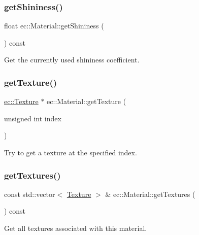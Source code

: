 \subsubsection{\texorpdfstring{get\+Shininess()}{getShininess()}}
{\footnotesize\ttfamily float ec\+::\+Material\+::get\+Shininess (\begin{DoxyParamCaption}{ }\end{DoxyParamCaption}) const}



Get the currently used shininess coefficient. 

\mbox{\label{classec_1_1_material_a8679615f24284e809f213b882bec81bf}} 
\subsubsection{\texorpdfstring{get\+Texture()}{getTexture()}}
{\footnotesize\ttfamily \mbox{\hyperlink{classec_1_1_texture}{ec\+::\+Texture}} $\ast$ ec\+::\+Material\+::get\+Texture (\begin{DoxyParamCaption}\item[{unsigned int}]{index }\end{DoxyParamCaption})}



Try to get a texture at the specified index. 

\mbox{\label{classec_1_1_material_a95d74f12ec9d69a764a249e36b6b857c}} 
\subsubsection{\texorpdfstring{get\+Textures()}{getTextures()}}
{\footnotesize\ttfamily const std\+::vector$<$ \mbox{\hyperlink{classec_1_1_texture}{Texture}} $>$ \& ec\+::\+Material\+::get\+Textures (\begin{DoxyParamCaption}{ }\end{DoxyParamCaption}) const}



Get all textures associated with this material. 

\mbox{\label{classec_1_1_material_a961612ff2caee16d5d4b8f9b74042cf2}} 
